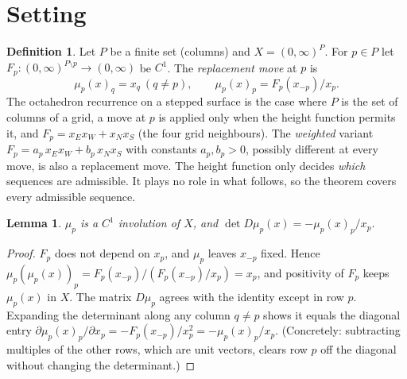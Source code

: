 \documentclass[11pt]{article}
\newtheorem{lemma}[theorem]{Lemma}
\theoremstyle{definition}
\newtheorem{definition}[theorem]{Definition}
\begin{document}
\section{Setting}
\begin{definition}
Let $P$ be a finite set (columns) and $X=(0,\infty)^P$. For $p\in P$ let
$F_p:(0,\infty)^{P\setminus p}\to(0,\infty)$ be $C^1$. The \emph{replacement move} at $p$ is
\[
\mu_p(x)_q = x_q\ (q\ne p),\qquad \mu_p(x)_p = F_p(x_{-p})/x_p .
\]
The octahedron recurrence on a stepped surface is the case where $P$ is the set of columns of a
grid, a move at $p$ is applied only when the height function permits it, and
$F_p = x_Ex_W + x_Nx_S$ (the four grid neighbours). The \emph{weighted} variant
$F_p=a_p\,x_Ex_W+b_p\,x_Nx_S$ with constants $a_p,b_p>0$, possibly different at every move, is
also a replacement move. The height function only decides \emph{which} sequences are
admissible. It plays no role in what follows, so the theorem covers every admissible sequence.
\end{definition}

\begin{lemma}\label{lem:one}
$\mu_p$ is a $C^1$ involution of $X$, and $\det D\mu_p(x) = -\mu_p(x)_p/x_p$.
\end{lemma}
\begin{proof}
$F_p$ does not depend on $x_p$, and $\mu_p$ leaves $x_{-p}$ fixed. Hence
$\mu_p(\mu_p(x))_p = F_p(x_{-p})/(F_p(x_{-p})/x_p)=x_p$, and positivity of $F_p$ keeps $\mu_p(x)$ in
$X$. The matrix $D\mu_p$ agrees with the identity except in row $p$. Expanding the determinant
along any column $q\neq p$ shows it equals the diagonal entry
$\partial\mu_p(x)_p/\partial x_p = -F_p(x_{-p})/x_p^2 = -\mu_p(x)_p/x_p$. (Concretely: subtracting
multiples of the other rows, which are unit vectors, clears row $p$ off the diagonal without
changing the determinant.)
\end{proof}
\end{document}
